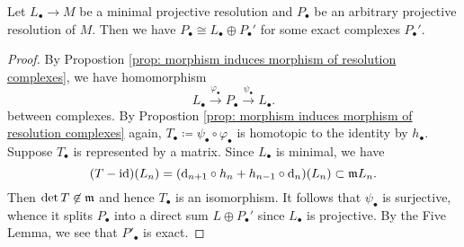     \begin{proposition}\label{prop: projective resolution is a direct sum of minimal projective resolution}
        Let \(L_\bullet \to M\) be a minimal projective resolution and \(P_\bullet\) be an arbitrary projective resolution of \(M\).
        Then we have \(P_\bullet \cong L_\bullet \oplus P_\bullet'\) for some exact complexes \(P_\bullet'\).
    \end{proposition}
    \begin{proof}
        By Propostion \ref{prop: morphism induces morphism of resolution complexes}, we have homomorphism 
        \[ L_\bullet \xrightarrow{\varphi_\bullet} P_\bullet \xrightarrow{\psi_\bullet} L_\bullet. \]
        between complexes.
        By Propostion \ref{prop: morphism induces morphism of resolution complexes} again, \(T_\bullet \coloneqq \psi_\bullet \circ \varphi_\bullet\) is homotopic to the identity by \(h_\bullet\).
        Suppose \(T_\bullet\) is represented by a matrix.
        Since \(L_\bullet\) is minimal, we have 
        \[ (T - {\operatorname{id}})(L_n) = ({\mathrm{d}}_{{n+1}} \circ h_n + h_{n-1} \circ {\mathrm{d}}_{n})(L_n) \subset {\mathfrak{m}} L_n. \]
        Then \(\det T \not\in {\mathfrak{m}}\) and hence \(T_\bullet\) is an isomorphism.
        It follows that \(\psi_\bullet\) is surjective, whence it splits \(P_\bullet\) into a direct sum \( L \oplus P_\bullet'\) since \(L_\bullet\) is projective. 
        By the Five Lemma, we see that \(P'_\bullet\) is exact.
    \end{proof}

        
